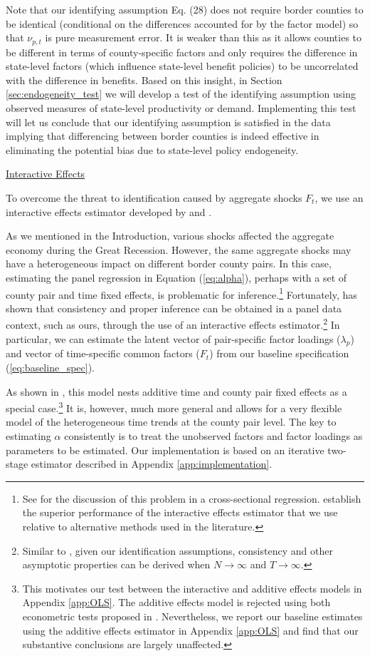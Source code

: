\documentclass[12pt]{article}
\newcommand{\1}{\mathbf{1}}
\begin{document}
Note that our identifying assumption Eq. (28) does not require border counties to be identical (conditional on the differences accounted for by the factor model) so that $\nu_{p,t}$ is pure measurement error. It is weaker than this as it allows counties to be different in terms of county-specific factors and only requires the difference in state-level factors (which influence state-level benefit policies) to be uncorrelated with the difference in benefits. Based on this insight, in Section \ref{sec:endogeneity_test} we will develop a test of the identifying assumption using observed measures of state-level productivity or demand. Implementing this test will let us conclude that our identifying assumption is satisfied in the data implying that differencing between border counties is indeed effective in eliminating the potential bias due to state-level policy endogeneity.


\noindent
\underline{Interactive Effects}

To overcome the threat to identification caused by aggregate shocks $F_t$, we use an interactive effects estimator developed by \citet{bai:09} and \citet{moon2015linear}. 

As we mentioned in the Introduction, various shocks affected the aggregate economy during the Great Recession. However, the same aggregate shocks may have a heterogeneous impact on different border county pairs. In this case, estimating the panel regression in Equation (\ref{eq:alpha}), perhaps with a set of county pair and time fixed effects, is problematic for inference.\footnote{See \citet{andrews:05} for the discussion of this problem in a cross-sectional regression. \citet{gobillon+magnac:13} establish the superior performance of the interactive effects estimator that we use relative to alternative methods used in the literature.} Fortunately, \citet{bai:09} has shown that consistency and proper inference can be obtained in a panel data context, such as ours, through the use of an interactive effects estimator.\footnote{Similar to \citet{gobillon+magnac:13}, given our identification assumptions, consistency and other asymptotic properties can be derived when $N \to \infty$ and $T \to \infty$.} In particular, we can estimate the latent vector of pair-specific factor loadings ($\lambda_{p}$) and vector of time-specific common factors ($F_{t}$) from our baseline specification (\ref{eq:baseline_spec}). 

As shown in \citet{bai:09}, this model nests additive time and county pair fixed effects as a special case.\footnote{This motivates our test between the interactive and additive effects models in Appendix \ref{app:OLS}. The additive effects model is rejected using both econometric tests proposed in \cite{bai:09}. Nevertheless, we report our baseline estimates using the additive effects estimator in Appendix \ref{app:OLS} and find that our substantive conclusions are largely unaffected.} It is, however, much more general and allows for a very flexible model of the heterogeneous time trends at the county pair level. The key to estimating $\alpha$ consistently is to treat the unobserved factors and factor loadings as parameters to be estimated. Our implementation is based on an iterative two-stage estimator described in Appendix \ref{app:implementation}.
\end{document}
